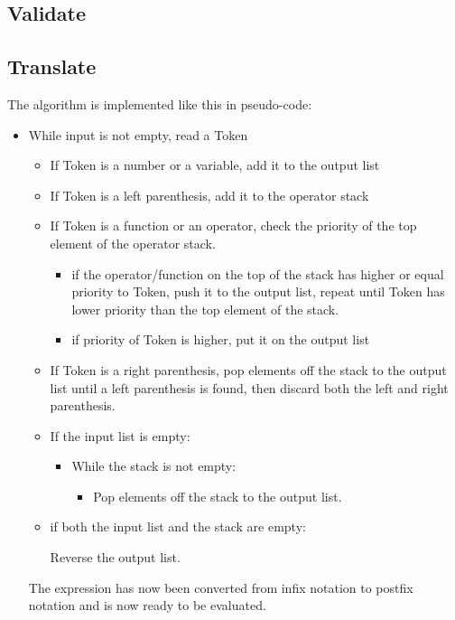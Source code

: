 \documentclass[12pt,a4paper]{article}
\begin{document}
\subsection{Validate}
\subsection{Translate}
\textnormal{
  The algorithm is implemented like this in pseudo-code:
}

\begin{itemize}
  \item While input is not empty, read a Token
\begin{itemize}
    \item If Token is a number or a variable, add it to the output list
    \item If Token is a left parenthesis, add it to the operator stack
    \item If Token is a function or an operator, check the priority of the top element of the operator stack.
    \begin{itemize}
      \item if the operator/function on the top of the stack has higher or equal priority to Token, 
      push it to the output list, repeat until Token has lower priority than the top element of the stack.
      \item if priority of Token is higher, put it on the output list
    \end{itemize}
    \item If Token is a right parenthesis, pop elements off the stack to the output list until a left 
    parenthesis is found, then discard both the left and right parenthesis.
    \item If the input list is empty:
    \begin{itemize}
      \item While the stack is not empty:
      \begin{itemize}
        \item Pop elements off the stack to the output list.
      \end{itemize}
    \end{itemize}
    \item if both the input list and the stack are empty:
    \begin{itemize}
      Reverse the output list.
    \end{itemize}
\end{itemize}
\textnormal{
  The expression has now been converted from infix notation to postfix notation and is now ready to be evaluated.
}

\end{itemize}
\end{document}
